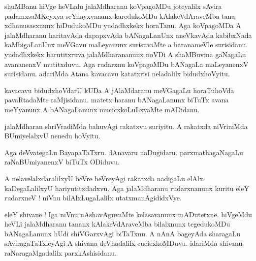 \documentclass{article}
\begin{document}
\begin{mn}%
shuMBanu hiVge heVLalu jalaMdharanu koVpagoMDu joteyalilx sAvira padamxsaMKeyxya seYnayxvanunx
karedukoMDu kAlakeVdAraveMba tana xdhanusasxnunx hiDudukoMDu yudadhxkekx horaTanu. Aga 
koVpagoMDa A jalaMdharanu haritavAda dapapxvAda bANagaLanUnx aneVkavAda kabibxNada 
kaMbigaLanUnx meVGavu maLeyanunx surisuvaMte a haranameVle surisidanu. yudadhxkekx 
barutitxruva jalaMdharananunx noVDi A shaMBuvina gaNagaLu avananenxV mutitxduvu. Aga 
rudarxnu koVpagoMDu bANagaLa maLeyanenxV surisidanu. adariMda Atana kavacavu katatxrisi 
neladalilx bidudxhoVyitu.
\end{mn}

\begin{mn}%
kavacavu bidudxhoVdarU kUDa A jAlaMdaranu meVGagaLu horaTuhoVda pavaRtadaMte raMjisidanu. 
matetx haranu bANagaLanunx biTuTx avana meYyanunx A bANagaLanunx mucicxkoLuLxvaMte mADidanu.
\end{mn}

\begin{mn}%
jalaMdharan shriVradiMda bahuvAgi rakatxvu suriyitu. A rakatxda niVriniMda BUmiyelalxvU 
nenedu hoVyitu.
\end{mn}

\begin{mn}%
Aga deVvategaLu BayapaTaTxru. dAnavaru naDugidaru. parxmathagaNagaLu raNaBUmiyanenxV biTuTx 
ODiduvu.
\end{mn}

\begin{mn}%
A nelavelalxdaralilxyU beVre beVreyAgi rakatxda nadigaLu elAlx kaDegaLalilxyU 
hariyutitxdadxvu. Aga jalaMdharanu rudarxnanunx kuritu eleY rudarxneV ! niVnu 
bilAlxLugaLalilx utatxmanAgididxVye.
\end{mn}

\begin{mn}%
eleY shivane ! Iga niVnu nAshavAguvaMte kelasavanunx mADutetxne. hiVgeMdu heVLi jalaMdharanu 
tananx kAlakeVdAraveMba bilalxnunx tegedukoMDu bANagaLanunx hUdi shiVGarxvAgi biTaTxnu. A 
nAnA bageyAda sharagaLu sAviragaTaTxleyAgi A shivana deVhadalilx cucicxkoMDuvu. idariMda 
shivanu raNaragaMgadalilx parxkAshisidanu.
\end{mn}
\end{document}
